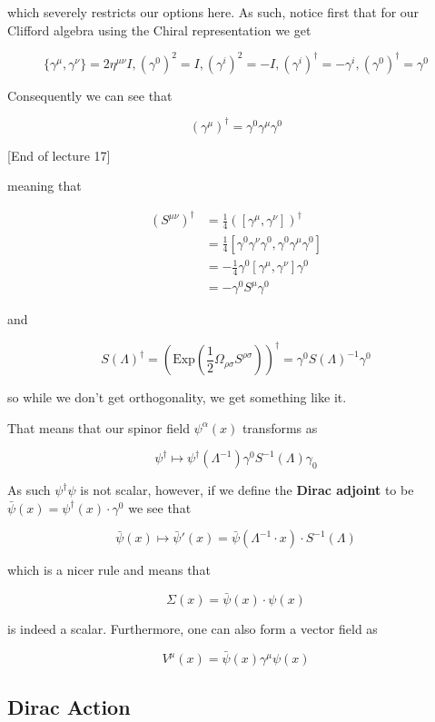 \documentclass{article}
\theoremstyle{definition}
\begin{document}
which severely restricts our options here. As such, notice first that for our
Clifford algebra using the Chiral representation we get

$$ \{\gamma^\mu, \gamma^\nu\} = 2\eta^{\mu \nu} I, (\gamma^0)^2 = I,
(\gamma^i)^2 = -I, (\gamma^i)^\dagger = -\gamma^i, (\gamma^0)^\dagger =
\gamma^0 $$

Consequently we can see that

$$ (\gamma^\mu)^\dagger = \gamma^0 \gamma^\mu \gamma^0 $$

[End of lecture 17]

meaning that

\begin{align*}
(S^{\mu \nu})^\dagger &= \frac{1}{4} ([\gamma^\mu, \gamma^\nu])^\dagger \\
&= \frac{1}{4} [\gamma^0 \gamma^\nu \gamma^0, \gamma^0 \gamma^\mu \gamma^0] \\
&= -\frac{1}{4} \gamma^0 [\gamma^\mu, \gamma^\nu] \gamma^0 \\
&= -\gamma^0 S^{\mu} \gamma^0
\end{align*}

and

$$ S(\Lambda)^\dagger = (\text{Exp}(\frac{1}{2} \Omega_{\rho \sigma} S^{\rho
  \sigma}))^\dagger = \gamma^0 S(\Lambda)^{-1} \gamma^0 $$

so while we don't get orthogonality, we get something like it.

That means that our spinor field $\psi^\alpha(x)$ transforms as

$$ \psi^\dagger \mapsto \psi^\dagger(\Lambda^{-1}) \gamma^0 S^{-1}(\Lambda)
\gamma_0 $$

As such $\psi^\dagger \psi$ is not scalar, however, if we define the
\textbf{Dirac adjoint} to be $\bar{\psi}(x) = \psi^\dagger(x) \cdot \gamma^0$ we
see that 

$$ \bar{\psi}(x) \mapsto \bar{\psi}'(x) = \bar{\psi}(\Lambda^{-1} \cdot x) \cdot
S^{-1}(\Lambda) $$

which is a nicer rule and means that

$$ \Sigma(x) = \bar{\psi}(x) \cdot \psi(x) $$

is indeed a scalar. Furthermore, one can also form a vector field as

$$ V^\mu(x) = \bar{\psi}(x) \gamma^\mu \psi(x) $$

\subsection{Dirac Action}
\end{document}
